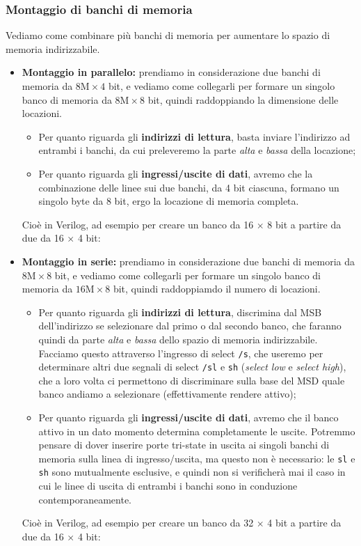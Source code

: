 \documentclass[a4paper,11pt]{article}
\begin{document}
\subsubsection{Montaggio di banchi di memoria}
Vediamo come combinare più banchi di memoria per aumentare lo spazio di memoria indirizzabile.
\begin{itemize}
	\item \textbf{Montaggio in parallelo:} 
prendiamo in considerazione due banchi di memoria da $8 \text{M} \times 4$ bit, e vediamo come collegarli per formare un singolo banco di memoria da $8 \text{M} \times 8$ bit, quindi raddoppiando la dimensione delle locazioni.
\begin{itemize}
	\item Per quanto riguarda gli \textbf{indirizzi di lettura}, basta inviare l'indirizzo ad entrambi i banchi, da cui preleveremo la parte \textit{alta} e \textit{bassa} della locazione;
	\item Per quanto riguarda gli \textbf{ingressi/uscite di dati}, avremo che la combinazione delle linee sui due banchi, da 4 bit ciascuna, formano un singolo byte da 8 bit, ergo la locazione di memoria completa.
\end{itemize}

Cioè in Verilog, ad esempio  per creare un banco da 16 $\times$ 8 bit a partire da due da 16 $\times$ 4 bit:



	\item \textbf{Montaggio in serie:}  
prendiamo in considerazione due banchi di memoria da $8 \text{M} \times 8$ bit, e vediamo come collegarli per formare un singolo banco di memoria da $16 \text{M} \times 8$ bit, quindi raddoppiamdo il numero di locazioni.
\begin{itemize}
	\item Per quanto riguarda gli \textbf{indirizzi di lettura}, discrimina dal MSB dell'indirizzo se selezionare dal primo o dal secondo banco, che faranno quindi da parte \textit{alta} e \textit{bassa} dello spazio di memoria indirizzabile. Facciamo questo attraverso l'ingresso di select \lstinline|/s|, che useremo per determinare altri due segnali di select \lstinline|/sl| e \lstinline|sh| (\textit{select low} e \textit{select high}), che a loro volta ci permettono di discriminare sulla base del MSD quale banco andiamo a selezionare (effettivamente rendere attivo); 
	\item Per quanto riguarda gli \textbf{ingressi/uscite di dati}, avremo che il banco attivo in un dato momento determina completamente le uscite. Potremmo pensare di dover inserire porte tri-state in uscita ai singoli banchi di memoria sulla linea di ingresso/uscita, ma questo non è necessario: le \lstinline|sl| e \lstinline|sh| sono mutualmente esclusive, e quindi non si verificherà mai il caso in cui le linee di uscita di entrambi i banchi sono in conduzione contemporaneamente.
\end{itemize}

Cioè in Verilog, ad esempio  per creare un banco da 32 $\times$ 4 bit a partire da due da 16 $\times$ 4 bit:


\end{itemize}
\end{document}

